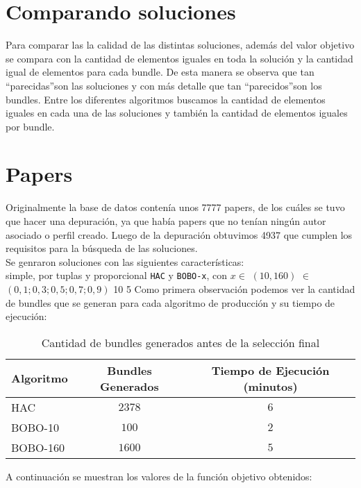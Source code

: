 \section{Comparando soluciones}
Para comparar las la calidad de las distintas soluciones, además del valor objetivo se compara con 
la cantidad de elementos iguales en toda la solución y la cantidad igual de elementos para cada 
bundle. De esta manera se observa que tan \textquotedblleft parecidas\textquotedblright son las 
soluciones y con más detalle que tan \textquotedblleft parecidos\textquotedblright son los bundles. 
Entre los diferentes algoritmos buscamos la cantidad de elementos iguales en cada una de las 
soluciones y también la cantidad de elementos iguales por bundle.
\section{Papers}
Originalmente la base de datos contenía unos 7777 papers, de los cuáles se tuvo que hacer una 
depuración, ya que había papers que no tenían ningún autor asociado o perfil creado. Luego de la 
depuración obtuvimos 4937 que cumplen los requisitos para la búsqueda de las soluciones.\\
Se genraron soluciones con las siguientes características:\\
\Solucion
{}
{simple, por tuplas y proporcional}
{\texttt{HAC} y \texttt{BOBO-x}, con  $x \in$ $(10, 160)$}
{$\in$ $(0,1; 0,3; 0,5; 0,7; 0,9)$}
{10}
{5}
Como primera observación podemos ver la cantidad de bundles que se generan para cada algoritmo de 
producción y su tiempo de ejecución:\\
\begin{table}[h]
  \centering
  \resizebox{\textwidth}{!} {
    \begin{tabular}{|lcc|}
    \hline
    Algoritmo & Bundles Generados & Tiempo de Ejecución (minutos) \\
    \hline
    HAC       & $2378$ & $6$ \\
    BOBO-10   & $100$  & $2$ \\
    BOBO-160  & $1600$ & $5$ \\
    \hline
    \end{tabular}
  }
    \caption {Cantidad de bundles generados antes de la selección final}
\end{table}
A continuación se muestran los valores de la función objetivo obtenidos:\\
